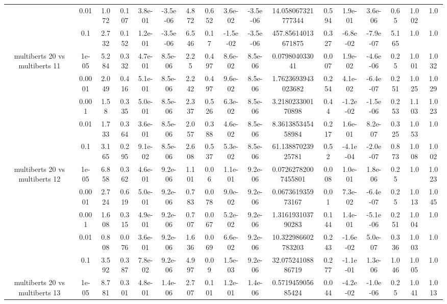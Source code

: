 \begin{tabular}{|c|c|c|c|c|c|c|c|c|c|c|c|c|c|c|c|c|}
 & 0.01 & 1.072 & 0.107 & 3.8e-01 & -3.5e-06 & 4.872 & 0.652 & 3.6e-02 & -3.5e-06 & 14.058067321777344 & 0.594 & 1.9e-01 & 3.6e-06 & 0.65 & 1.002 & 1.0 \\
 & 0.1 & 2.732 & 0.152 & 1.2e-01 & -3.5e-06 & 6.546 & 0.17 & -1.5e-02 & -3.5e-06 & 457.85614013671875 & 0.327 & -6.8e-02 & -7.9e-07 & 5.165 & 1.0 & 1.0 \\
\hline
\multirow{5}{*}{multiberts 20 vs multiberts 11} & 1e-05 & 5.284 & 0.332 & 4.7e-01 & 8.5e-06 & 2.25 & 0.497 & 8.6e-02 & 8.5e-06 & 0.079804033041 & 0.007 & 1.9e-02 & -4.6e-06 & 0.25 & 1.001 & 1.032 \\
 & 0.0001 & 2.049 & 0.416 & 5.1e-01 & 8.5e-06 & 2.242 & 0.497 & 9.6e-02 & 8.5e-06 & 1.7623693943023682 & 0.254 & 4.1e-02 & -6.4e-07 & 0.251 & 1.025 & 1.029 \\
 & 0.001 & 1.58 & 0.335 & 5.0e-01 & 8.5e-06 & 2.337 & 0.526 & 6.3e-02 & 8.5e-06 & 3.218023300170898 & 0.44 & -1.2e-02 & -1.5e-06 & 0.253 & 1.103 & 1.023 \\
 & 0.01 & 1.733 & 0.364 & 3.6e-01 & 8.5e-06 & 2.057 & 0.388 & 4.6e-02 & 8.5e-06 & 8.361385345458984 & 0.217 & 1.6e-01 & 8.2e-07 & 0.325 & 1.053 & 1.0 \\
 & 0.1 & 3.165 & 0.295 & 9.1e-02 & 8.5e-06 & 2.608 & 0.537 & 5.3e-02 & 8.5e-06 & 61.13887023925781 & 0.52 & -4.1e-04 & -2.0e-07 & 0.873 & 1.008 & 1.002 \\
\hline
\multirow{5}{*}{multiberts 20 vs multiberts 12} & 1e-05 & 6.858 & 0.362 & 4.6e-01 & 9.2e-06 & 1.101 & 0.06 & 1.1e-01 & 9.2e-06 & 0.07262782007455801 & 0.008 & 1.0e-01 & 1.8e-06 & 0.25 & 1.0 & 1.023 \\
 & 0.0001 & 2.724 & 0.619 & 5.0e-01 & 9.2e-06 & 0.783 & 0.078 & 9.0e-02 & 9.2e-06 & 0.067361935973167 & 0.01 & 7.3e-02 & -6.4e-07 & 0.25 & 1.013 & 1.045 \\
 & 0.001 & 1.608 & 0.315 & 4.9e-01 & 9.2e-06 & 0.707 & 0.067 & 5.2e-02 & 9.2e-06 & 1.316193103790283 & 0.144 & 1.4e-01 & -5.1e-06 & 0.251 & 1.004 & 1.0 \\
 & 0.01 & 0.808 & 0.076 & 3.6e-01 & 9.2e-06 & 1.636 & 0.069 & 6.6e-02 & 9.2e-06 & 10.322986602783203 & 0.243 & -1.6e-02 & 5.0e-07 & 0.336 & 1.003 & 1.0 \\
 & 0.1 & 3.592 & 0.387 & 7.8e-02 & 9.2e-06 & 4.997 & 0.09 & 1.5e-03 & 9.2e-06 & 32.07524108886719 & 0.277 & -1.1e-01 & 1.3e-06 & 1.046 & 1.005 & 1.0 \\
\hline
\multirow{5}{*}{multiberts 20 vs multiberts 13} & 1e-05 & 8.781 & 0.301 & 4.8e-01 & 1.4e-06 & 2.707 & 0.101 & 1.2e-01 & 1.4e-06 & 0.571945905685424 & 0.044 & -4.2e-02 & -1.0e-06 & 0.25 & 1.041 & 1.013 \\

\end{tabular}
